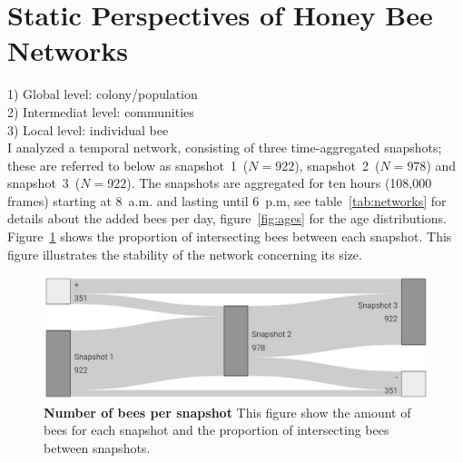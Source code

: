 \section{Static Perspectives of Honey Bee Networks}

1) Global level: colony/population\\
2) Intermediat level: communities\\
3) Local level: individual bee\\

I analyzed a temporal network, consisting of three time-aggregated snapshots; these are referred to below as snapshot~1~($N=922$), snapshot~2~($N=978$) and snapshot~3~($N=922$). 
The snapshots are aggregated for ten hours (108,000 frames) starting at 8~a.m. and lasting until 6~p.m, see table~\ref{tab:networks} for details about the added bees per day,  figure~\ref{fig:ages} for the age distributions. Figure~\ref{fig:network-matching} shows the proportion of intersecting bees between each snapshot. This figure illustrates the stability of the network concerning its size. 



\begin{figure}[htb]
	\centering
	\includegraphics[width=.8\textwidth]{Figures/network_matching}
	\caption[Number of bees per snapshot]{\textbf{Number of bees per snapshot} This figure show the amount of bees for each snapshot and the proportion of intersecting bees between snapshots.}
	\label{fig:network-matching}
\end{figure}




\clearpage
